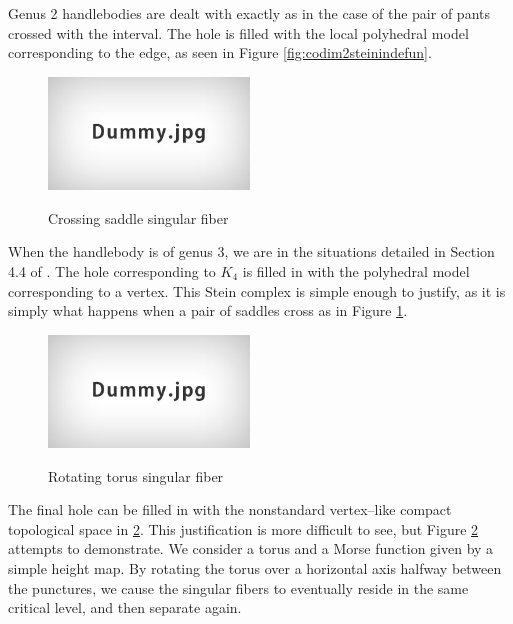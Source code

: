 Genus 2 handlebodies are dealt with exactly as in the case of the pair of pants crossed with the interval.
The hole is filled with the local polyhedral model corresponding to the edge, as seen in Figure \ref{fig:codim2steinindefun}.

\begin{figure}
	\centering
	\captionsetup{justification=centering}
	\caption{Crossing saddle singular fiber}
	\includegraphics[height=3cm]{figures/dummy.jpg}
	\label{fig:crossingsaddles}
\end{figure}

When the handlebody is of genus 3, we are in the situations detailed in Section 4.4 of \cite{CostThur08}.
The hole corresponding to $K_4$ is filled in with the polyhedral model corresponding to a vertex.
This Stein complex is simple enough to justify, as it is simply what happens when a pair of saddles cross as in Figure \ref{fig:crossingsaddles}.

\begin{figure}
	\centering
	\captionsetup{justification=centering}
	\caption{Rotating torus singular fiber}
	\includegraphics[height=3cm]{figures/dummy.jpg}
	\label{fig:doublecone}
\end{figure}

The final hole can be filled in with the nonstandard vertex--like compact topological space in \ref{fig:doublecone}.
This justification is more difficult to see, but Figure \ref{fig:doublecone} attempts to demonstrate.
We consider a torus and a Morse function given by a simple height map.
By rotating the torus over a horizontal axis halfway between the punctures, we cause the singular fibers to eventually reside in the same critical level, and then separate again.






